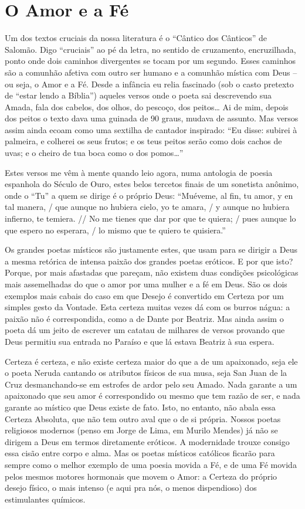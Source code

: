 \chapter{O Amor e a Fé}

Um dos textos cruciais da nossa literatura é o “Cântico dos Cânticos”
de Salomão. Digo “cruciais” ao pé da letra, no sentido de cruzamento,
encruzilhada, ponto onde dois caminhos divergentes se tocam por um
segundo. Esses caminhos são a comunhão afetiva com outro ser humano e
a comunhão mística com Deus -- ou seja, o Amor e a Fé.  Desde a
infância eu relia fascinado (sob o casto pretexto de “estar lendo a
Bíblia”) aqueles versos onde o poeta sai descrevendo sua Amada, fala
dos cabelos, dos olhos, do pescoço, dos peitos…  Ai de mim, depois
dos peitos o texto dava uma guinada de 90 graus, mudava de assunto.
Mas versos assim ainda ecoam como uma sextilha de cantador inspirado:
“Eu disse: subirei à palmeira, e colherei os seus frutos; e os teus
peitos serão como dois cachos de uvas; e o cheiro de tua boca como o
dos pomos…”

Estes versos me vêm à mente quando leio agora, numa antologia de
poesia espanhola do Século de Ouro, estes belos tercetos finais de um
sonetista anônimo, onde o “Tu” a quem se dirige é o próprio Deus:
“Muéveme, al fin, tu amor, y en tal manera, / que aunque no hubiera
cielo, yo te amara, / y aunque no hubiera infierno, te temiera. // No
me tienes que dar por que te quiera; / pues aunque lo que espero no
esperara, / lo mismo que te quiero te quisiera.”

Os grandes poetas místicos são justamente estes, que usam para se
dirigir a Deus a mesma retórica de intensa paixão dos grandes poetas
eróticos. E por que isto? Porque, por mais afastadas que pareçam, não
existem duas condições psicológicas mais assemelhadas do que o amor
por uma mulher e a fé em Deus. São os dois exemplos mais cabais do
caso em que Desejo é convertido em Certeza por um simples gesto da
Vontade. Esta certeza muitas vezes dá com os burros nágua: a paixão
não é correspondida, como a de Dante por Beatriz. Mas ainda assim o
poeta dá um jeito de escrever um catatau de milhares de versos
provando que Deus permitiu sua entrada no Paraíso e que lá estava
Beatriz à sua espera.

Certeza é certeza, e não existe certeza maior do que a de um
apaixonado, seja ele o poeta Neruda cantando os atributos físicos de
sua musa, seja San Juan de la Cruz desmanchando-se em estrofes de
ardor pelo seu Amado.  Nada garante a um apaixonado que seu amor é
correspondido ou mesmo que tem razão de ser, e nada garante ao
místico que Deus existe de fato.  Isto, no entanto, não abala essa
Certeza Absoluta, que não tem outro aval que o de si própria.  Nossos
poetas religiosos modernos (penso em Jorge de Lima, em Murilo Mendes)
já não se dirigem a Deus em termos diretamente eróticos. A
modernidade trouxe consigo essa cisão entre corpo e alma. Mas os
poetas místicos católicos ficarão para sempre como o melhor exemplo
de uma poesia movida a Fé, e de uma Fé movida pelos mesmos motores
hormonais que movem o Amor: a Certeza do próprio desejo físico, o
mais intenso (e aqui pra nós, o menos dispendioso) dos estimulantes
químicos.

